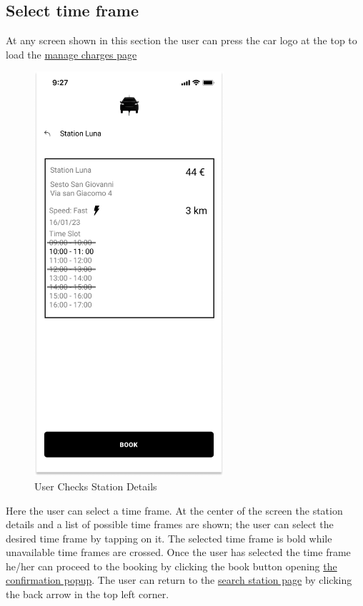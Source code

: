 \subsection{Select time frame}
At any screen shown in this section the user can press the car logo at the top to load the \hyperref[fig:myCharges]{manage charges page}
\begin{figure}[H]
    \centering
    \includegraphics[keepaspectratio, height=15cm]{Mockup/UserAppInterface/Station Details.png}
    \caption{User Checks Station Details}
    \label{fig:StationDetails}
\end{figure}
Here the user can select a time frame. At the center of the screen the station details and a list of possible time frames are shown; the user can select the desired time frame by tapping on it. The selected time frame is bold while unavailable time frames are crossed. Once the user has selected the time frame he/her can proceed to the booking by clicking the book button opening \hyperref[pop:Booking]{the confirmation popup}. The user can return to the \hyperref[fig:Search]{search station page} by clicking the back arrow in the top left corner.

